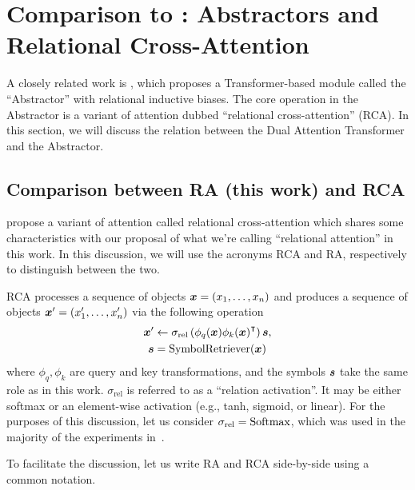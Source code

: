 \section{Comparison to \texorpdfstring{\citet{altabaa2024abstractors}}{Altabaa et al. (2024)}: Abstractors and Relational Cross-Attention}\label{sec:appdx_abstrator}

A closely related work is \citet{altabaa2024abstractors}, which proposes a Transformer-based module called the ``Abstractor'' with relational inductive biases. The core operation in the Abstractor is a variant of attention dubbed ``relational cross-attention'' (RCA). In this section, we will discuss the relation between the Dual Attention Transformer and the Abstractor.

\subsection{Comparison between RA (this work) and RCA \texorpdfstring{\citep{altabaa2024abstractors}}{(Altabaa et al., 2024)}}

\citet{altabaa2024abstractors} propose a variant of attention called relational cross-attention which shares some characteristics with our proposal of what we're calling ``relational attention'' in this work. In this discussion, we will use the acronyms RCA and RA, respectively to distinguish between the two.

RCA processes a sequence of objects $\bm{x} = (x_1, \ldots, x_n)$ and produces a sequence of objects $\bm{x}' = (x_1', \ldots, x_n')$ via the following operation
\begin{align*}
    \bm{x}' &\gets \sigma_{\mathrm{rel}}\left(\phi_q(\bm{x}) {\phi_k(\bm{x})}^\intercal\right) \bm{s}, \\
    \bm{s} &= \mathrm{SymbolRetriever}(\bm{x})
\end{align*}
where $\phi_q, \phi_k$ are query and key transformations, and the symbols $\bm{s}$ take the same role as in this work. $\sigma_{\mathrm{rel}}$ is referred to as a ``relation activation''. It may be either softmax or an element-wise activation (e.g., tanh, sigmoid, or linear). For the purposes of this discussion, let us consider $\sigma_{\mathrm{rel}} = \mathrm{Softmax}$, which was used in the majority of the experiments in~\citep{altabaa2024abstractors}.

To facilitate the discussion, let us write RA and RCA side-by-side using a common notation.

